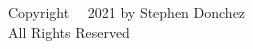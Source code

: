 \thispagestyle{plain}
\setcounter{page}{2}

\begingroup
\centering
\null
\vfill
Copyright ~{\sffamily\textcopyright}~2021 by Stephen Donchez
\\[0.5em]
All Rights Reserved
\vfill
\par
\endgroup
\clearpage